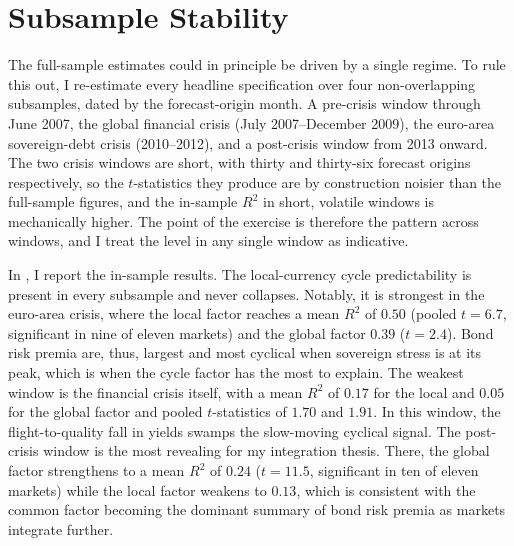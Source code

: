 \section{Subsample Stability}
\label{sec:rob-subsample}

The full-sample estimates could in principle be driven by a single regime. To
rule this out, I re-estimate every headline specification over four
non-overlapping subsamples, dated by the forecast-origin month. A pre-crisis
window through June 2007, the global financial crisis (July 2007--December
2009), the euro-area sovereign-debt crisis (2010--2012), and a post-crisis window
from 2013 onward. The two crisis windows are short, with thirty and thirty-six
forecast origins respectively, so the $t$-statistics they produce are by
construction noisier than the full-sample figures, and the in-sample $R^{2}$ in
short, volatile windows is mechanically higher. The point of the exercise is
therefore the pattern across windows, and I treat the level in any single window as indicative.

In , I report the in-sample results. The local-currency
cycle predictability is present in every subsample and never collapses.
Notably, it is strongest in the euro-area crisis, where the local factor
reaches a mean $R^{2}$ of $0.50$ (pooled $t=6.7$, significant in nine of eleven
markets) and the global factor $0.39$ ($t=2.4$). Bond risk premia are, thus,
largest and most cyclical when sovereign stress is at its peak, which
is when the cycle factor has the most to explain. The weakest window is the
financial crisis itself, with a mean $R^{2}$ of $0.17$ for the local and $0.05$
for the global factor and pooled $t$-statistics of $1.70$ and $1.91$. In this window, the
flight-to-quality fall in yields swamps the slow-moving cyclical signal. The
post-crisis window is the most revealing for my integration thesis. There, the
global factor strengthens to a mean $R^{2}$ of $0.24$ ($t=11.5$,
significant in ten of eleven markets) while the local factor weakens to $0.13$,
which is consistent with the common factor becoming the dominant summary of bond
risk premia as markets integrate further.

